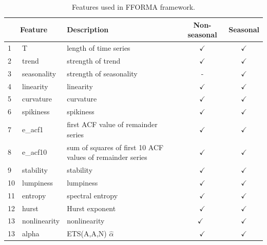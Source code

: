 \documentclass[11pt,a4paper,]{article}
\def\yes{$\checkmark$}
\theoremstyle{definition}
\theoremstyle{definition}
\theoremstyle{definition}
\theoremstyle{remark}
\begin{document}
\begin{table}[!htp]
\centering\footnotesize\tabcolsep=0.12cm
\caption{Features used in FFORMA framework.}
\label{feature}
\begin{tabular}{llp{}cc}
\toprule
\multicolumn{2}{c}{Feature} & Description & Non-seasonal & Seasonal\\
\midrule
1  & T              & length of time series                                                                   & \yes  & \yes \\
2  & trend          & strength of trend                                                                       & \yes  & \yes\\
3  & seasonality    & strength of seasonality                                                                 & -     & \yes \\
4  & linearity      & linearity                                                                               & \yes  & \yes \\
5  & curvature      & curvature                                                                               & \yes  & \yes \\
6  & spikiness      & spikiness                                                                               & \yes  & \yes \\
7  & e\_acf1        & first ACF value of remainder series                                                     & \yes  & \yes \\
8  & e\_acf10       & sum of squares of first 10 ACF values of remainder series                                                    & \yes  & \yes \\
9  & stability      & stability                                                                               & \yes  & \yes \\
10  & lumpiness      & lumpiness                                                                               & \yes  & \yes \\
11 & entropy        & spectral entropy                                                                        & \yes  & \yes \\
12 & hurst          & Hurst exponent                                                                          & \yes  & \yes \\
13 & nonlinearity   & nonlinearity                                                                            & \yes\ & \yes \\
13 & alpha          & ETS(A,A,N) $\hat\alpha$                                                                 & \yes  & \yes \\

\end{tabular}
\end{table}
\end{document}
